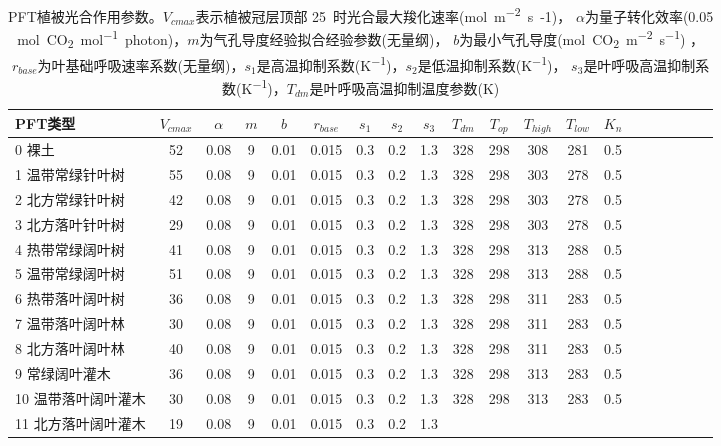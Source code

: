 \begin{landscape}
\begin{table}[htbp]
        \centering
        \caption[PFT植被光合作用参数]{PFT植被光合作用参数。$V_{cmax}$表示植被冠层顶部 25~\textcelsius 时光合最大羧化速率(\unit{mol.m^{-2}.s{-1}})，
        $\alpha$为量子转化效率(0.05 \unit{mol.CO_2.mol^{-1}.photon})，$m$为气孔导度经验拟合经验参数(无量纲)，
        $b$为最小气孔导度(\unit{mol.CO_2.m^{-2}.s^{-1}}) ，
        $r_{base}$为叶基础呼吸速率系数(无量纲)，$s_1$是高温抑制系数(\unit{K^{-1}})，$s_2$是低温抑制系数(\unit{K^{-1}})，
        $s_3$是叶呼吸高温抑制系数(\unit{K^{-1}})，$T_{dm}$是叶呼吸高温抑制温度参数(K)}
        \label{tab:PFT植被光合作用参数1}
        \begin{tabular}{@{}lccccccccccccccccccc@{}}
        \toprule
        PFT类型     &$ V_{cmax}$ & $\alpha$ & $m$& $b$ & $r_{base}$ & $s_1$ & $s_2$ & $s_3$ & $T_{dm}$ & $T_{op}$ & $T_{high}$ & $T_{low}$ & $K_n$  \\ \midrule
0 裸土 & 52 & 0.08 & 9 & 0.01 & 0.015 & 0.3 & 0.2 & 1.3 & 328 & 298 &
308 & 281 & 0.5 \\
1 温带常绿针叶树 & 55 & 0.08 & 9 & 0.01 & 0.015 & 0.3 & 0.2 & 1.3 & 328
& 298 & 303 & 278 & 0.5 \\
2 北方常绿针叶树 & 42 & 0.08 & 9 & 0.01 & 0.015 & 0.3 & 0.2 & 1.3 & 328
& 298 & 303 & 278 & 0.5 \\
3 北方落叶针叶树 & 29 & 0.08 & 9 & 0.01 & 0.015 & 0.3 & 0.2 & 1.3 & 328
& 298 & 303 & 278 & 0.5 \\
4 热带常绿阔叶树 & 41 & 0.08 & 9 & 0.01 & 0.015 & 0.3 & 0.2 & 1.3 & 328
& 298 & 313 & 288 & 0.5 \\
5 温带常绿阔叶树 & 51 & 0.08 & 9 & 0.01 & 0.015 & 0.3 & 0.2 & 1.3 &
328 & 298 & 313 & 288 & 0.5 \\
6 热带落叶阔叶树 & 36 & 0.08 & 9 & 0.01 & 0.015 & 0.3 & 0.2 & 1.3 & 328
& 298 & 311 & 283 & 0.5 \\
7 温带落叶阔叶林 & 30 & 0.08 & 9 & 0.01 & 0.015 & 0.3 & 0.2 & 1.3 & 328
& 298 & 311 & 283 & 0.5 \\
8 北方落叶阔叶林 & 40 & 0.08 & 9 & 0.01 & 0.015 & 0.3 & 0.2 & 1.3 & 328
& 298 & 311 & 283 & 0.5 \\
9 常绿阔叶灌木 & 36 & 0.08 & 9 & 0.01 & 0.015 & 0.3 & 0.2 & 1.3 & 328 &
298 & 313 & 283 & 0.5 \\
10 温带落叶阔叶灌木 & 30 & 0.08 & 9 & 0.01 & 0.015 & 0.3 & 0.2 & 1.3 &
328 & 298 & 313 & 283 & 0.5 \\
11 北方落叶阔叶灌木 & 19 & 0.08 & 9 & 0.01 & 0.015 & 0.3 & 0.2 & 1.3 &

\end{tabular}
\end{table}
\end{landscape}
